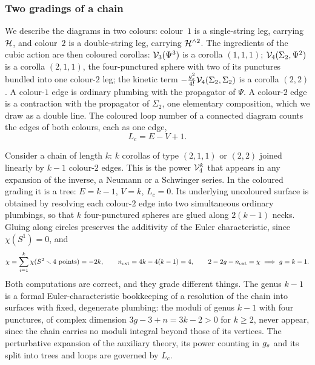\subsubsection{Two gradings of a chain}
\label{sec:ws1:grading}

We describe the diagrams in two colours: colour~$1$ is a single-string leg, carrying $\mathcal{H}$, and colour~$2$ is a double-string leg, carrying $\mathcal{H}^{\wedge 2}$.
The ingredients of the cubic action are then coloured corollas: $\mathcal{V}_{3}(\Psi^3)$ is a corolla $(1, 1, 1)$; $\mathcal{V}_{4}(\Sigma_2, \Psi^2)$ is a corolla $(2, 1, 1)$, the four-punctured sphere with two of its punctures bundled into one colour-$2$ leg; the kinetic term $- \tfrac{g_s^2}{4!} \mathcal{V}_{4}(\Sigma_2, \Sigma_2)$ is a corolla $(2, 2)$.
A colour-$1$ edge is ordinary plumbing with the propagator of $\Psi$.
A colour-$2$ edge is a contraction with the propagator of $\Sigma_2$, one elementary composition, which we draw as a double line.
The coloured loop number of a connected diagram counts the edges of both colours, each as one edge,
\begin{equation}
  \label{eq:ch9:coloured-loops}
  L_c
    = E - V + 1.
\end{equation}

Consider a chain of length $k$: $k$ corollas of type $(2, 1, 1)$ or $(2, 2)$ joined linearly by $k - 1$ colour-$2$ edges.
This is the power $\mathcal{V}_{4}^k$ that appears in any expansion of the inverse, a Neumann or a Schwinger series.
In the coloured grading it is a tree: $E = k - 1$, $V = k$, $L_c = 0$.
Its underlying uncoloured surface is obtained by resolving each colour-$2$ edge into two simultaneous ordinary plumbings, so that $k$ four-punctured spheres are glued along $2 (k - 1)$ necks.
Gluing along circles preserves the additivity of the Euler characteristic, since $\chi(S^1) = 0$, and
\begin{equation}
  \label{eq:ch9:chain-genus}
  \chi
    = \sum_{i = 1}^k \chi(S^2 \smallsetminus 4 \text{ points})
    = - 2 k,
  \qquad
  n_{\rm ext}
    = 4 k - 4 (k - 1)
    = 4,
  \qquad
  2 - 2 g - n_{\rm ext}
    = \chi
  \;\Longrightarrow\;
  g
    = k - 1.
\end{equation}
Both computations are correct, and they grade different things.
The genus $k - 1$ is a formal Euler-characteristic bookkeeping of a resolution of the chain into surfaces with fixed, degenerate plumbing: the moduli of genus $k - 1$ with four punctures, of complex dimension $3 g - 3 + n = 3 k - 2 > 0$ for $k \ge 2$, never appear, since the chain carries no moduli integral beyond those of its vertices.
The perturbative expansion of the auxiliary theory, its power counting in $g_s$ and its split into trees and loops are governed by $L_c$.

